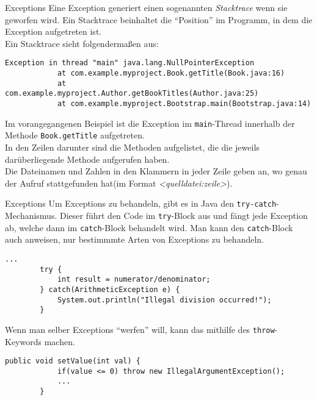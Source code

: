 \begin{frame}[fragile]{Exceptions}
    \onslide<+->
    Eine Exception generiert einen sogenannten \textit{Stacktrace} wenn sie geworfen wird. Ein Stacktrace beinhaltet die \enquote{Position} im Programm, in dem die Exception aufgetreten ist.\\
    \onslide<+->
    Ein Stacktrace sieht folgendermaßen aus:
    \begin{lstlisting}[basicstyle=\ttfamily\scriptsize,gobble=8]
        Exception in thread "main" java.lang.NullPointerException
            at com.example.myproject.Book.getTitle(Book.java:16)
            at com.example.myproject.Author.getBookTitles(Author.java:25)
            at com.example.myproject.Bootstrap.main(Bootstrap.java:14)
    \end{lstlisting}
    \onslide<+->
    Im vorangegangenen Beispiel ist die Exception im \texttt{main}-Thread innerhalb der Methode \texttt{Book.getTitle} aufgetreten.\\
    \onslide<+->
    In den Zeilen darunter sind die Methoden aufgelistet, die die jeweils darüberliegende Methode aufgerufen haben.\\
    \onslide<+->
    Die Dateinamen und Zahlen in den Klammern in jeder Zeile geben an, wo genau der Aufruf stattgefunden hat(im Format \textit{<quelldatei:zeile>}).
\end{frame}

\begin{frame}[fragile]{Exceptions}
    \onslide<+->
    Um Exceptions zu behandeln, gibt es in Java den \texttt{try-catch}-Mechanismus. Dieser führt den Code im \texttt{try}-Block aus und fängt jede Exception ab, welche dann im \texttt{catch}-Block behandelt wird. Man kann den \texttt{catch}-Block auch anweisen, nur bestimmmte Arten von Exceptions zu behandeln.
    \onslide<+->
    \begin{lstlisting}[basicstyle=\ttfamily\scriptsize,gobble=8]
        ...
        try {
            int result = numerator/denominator;
        } catch(ArithmeticException e) {
            System.out.println("Illegal division occurred!");
        }
    \end{lstlisting}
    \onslide<+->
    Wenn man selber Exceptions \enquote{werfen} will, kann das mithilfe des \texttt{throw}-Keywords machen.
    \begin{lstlisting}[basicstyle=\ttfamily\scriptsize,gobble=8]
        public void setValue(int val) {
            if(value <= 0) throw new IllegalArgumentException();
            ...
        }
    \end{lstlisting}
\end{frame}

